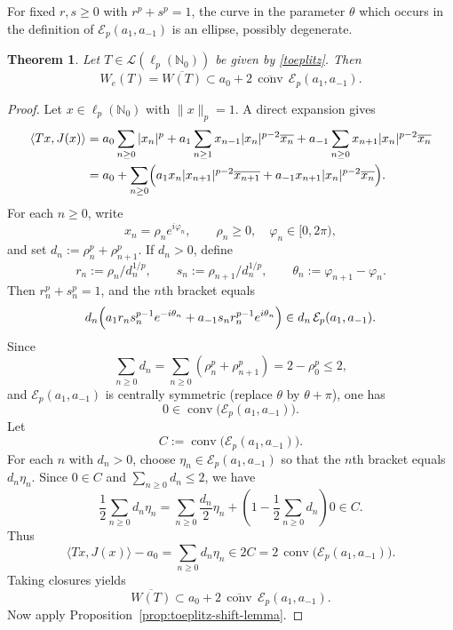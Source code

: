 \documentclass[11pt]{amsart}
\numberwithin{equation}{section}
\newtheorem{theorem}{Theorem}[section]
\theoremstyle{definition}
\theoremstyle{remark}
\DeclareMathOperator{\conv}{conv}
\newcommand{\ip}[2]{\langle #1,#2\rangle}
\newcommand{\We}{W_e}
\begin{document}
For fixed $r,s\ge0$ with $r^p+s^p=1$, the curve in the parameter $\theta$
which occurs in the definition of $\mathcal E_p(a_1,a_{-1})$ is an ellipse,
possibly degenerate.

\begin{theorem}
\label{thm:toeplitz-tridiag-upper}
Let $T\in \mathcal L(\ell_p(\mathbb N_0))$ be given by \eqref{toeplitz}.
Then
\[
\We(T)=\overline{W(T)}
\subset a_0+2\,\overline{\conv}\,\mathcal E_p(a_1,a_{-1}).
\]
\end{theorem}

\begin{proof}
Let $x\in \ell_p(\mathbb N_0)$ with $\|x\|_p=1.$
 A direct expansion gives
\begin{align*}
\ip{Tx}{J(x)}
&=a_0\sum_{n\ge0}|x_n|^p
+a_1\sum_{n\ge1}x_{n-1}|x_n|^{p-2}\overline{x_n}
+a_{-1}\sum_{n\ge0}x_{n+1}|x_n|^{p-2}\overline{x_n}\\
&=a_0+\sum_{n\ge0}\Bigl(a_1x_n|x_{n+1}|^{p-2}\overline{x_{n+1}}+a_{-1}x_{n+1}|x_n|^{p-2}\overline{x_n}\Bigr).
\end{align*}
For each $n\ge0$, write
\[
        x_n=\rho_ne^{i\varphi_n},
        \qquad \rho_n\ge0,\quad \varphi_n\in[0,2\pi),
\]
and set $d_n:=\rho_n^p+\rho_{n+1}^p$. If $d_n>0$, define
\[
r_n:=\rho_n/d_n^{1/p},\qquad s_n:=\rho_{n+1}/d_n^{1/p},\qquad \theta_n:=\varphi_{n+1}-\varphi_n.
\]
Then $r_n^p+s_n^p=1$, and the $n$th bracket equals
\[
d_n\Bigl(a_1r_ns_n^{p-1}e^{-i\theta_n}+a_{-1}s_nr_n^{p-1}e^{i\theta_n}\Bigr)
\in d_n\,\mathcal E_p(a_1,a_{-1}).
\]
Since
\[
\sum_{n\ge0}d_n=\sum_{n\ge0}(\rho_n^p+\rho_{n+1}^p)=2-\rho_0^p\le 2,
\]
and $\mathcal E_p(a_1,a_{-1})$ is centrally symmetric (replace $\theta$ by $\theta+\pi$), one has
\[
0\in \conv\bigl(\mathcal E_p(a_1,a_{-1})\bigr).
\]
Let
\[
C:=\conv\bigl(\mathcal E_p(a_1,a_{-1})\bigr).
\]
For each $n$ with $d_n>0$, choose $\eta_n\in\mathcal E_p(a_1,a_{-1})$ so that the $n$th bracket equals $d_n\eta_n$. Since $0\in C$ and $\sum_{n\ge0}d_n\le2$, we have
\[
\frac12\sum_{n\ge0}d_n\eta_n
=\sum_{n\ge0}\frac{d_n}{2}\eta_n+\left(1-\frac12\sum_{n\ge0}d_n\right)0\in C.
\]
Thus
\[
\ip{Tx}{J(x)}-a_0=\sum_{n\ge0}d_n\eta_n\in 2C
=2\,\conv\bigl(\mathcal E_p(a_1,a_{-1})\bigr).
\]
Taking closures yields
\[
\overline{W(T)}\subset a_0+2\,\overline{\conv}\,\mathcal E_p(a_1,a_{-1}).
\]
Now apply Proposition~\ref{prop:toeplitz-shift-lemma}.
\end{proof}
\end{document}
